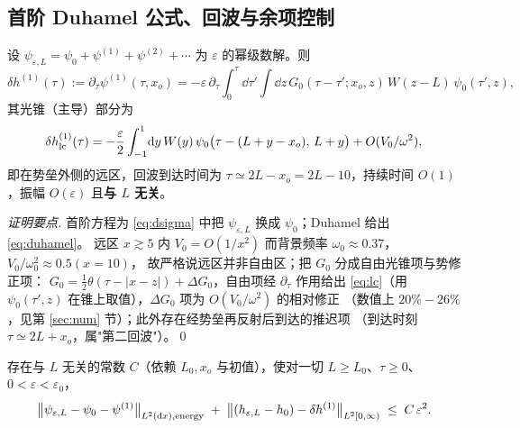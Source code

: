 \subsection{首阶 Duhamel 公式、回波与余项控制}

\begin{proposition}[首阶波形差]\label{prop:first}
设 $\psi_{\varepsilon,L}=\psi_0+\psi^{(1)}+\psi^{(2)}+\cdots$ 为 $\varepsilon$ 的幂级数解。则
\begin{equation}
\delta h^{(1)}(\tau):=\partial_\tau\psi^{(1)}(\tau,x_o)
=-\varepsilon\,\partial_\tau\!\int_0^\tau\!\dd\tau'\!\int\!\dd z\,
G_0(\tau-\tau';x_o,z)\,W(z-L)\,\psi_0(\tau',z),
\label{eq:duhamel}
\end{equation}
其光锥（主导）部分为
\begin{equation}
\delta h^{(1)}_{\rm lc}(\tau)=-\frac{\varepsilon}{2}\int_{-1}^{1}\!\mathrm{d} y\,
W(y)\,\psi_0\big(\tau-(L+y-x_o),\,L+y\big)+O(V_0/\omega^2),
\label{eq:lc}
\end{equation}
即在势垒外侧的远区，回波到达时间为 $\tau\simeq 2L-x_o=2L-10$，持续时间 $O(1)$，振幅
$O(\varepsilon)$ 且\textbf{与 $L$ 无关}。
\end{proposition}

\begin{proof}[证明要点]
首阶方程为 \eqref{eq:dsigma} 中把 $\psi_{\varepsilon,L}$ 换成 $\psi_0$；Duhamel 给出 \eqref{eq:duhamel}。
远区 $x\gtrsim5$ 内 $V_0=O(1/x^2)$ 而背景频率 $\omega_0\approx0.37$，$V_0/\omega_0^2\approx0.5(x=10)$，
故严格说远区并非自由区；把 $G_0$ 分成自由光锥项与势修正项：
$G_0=\frac12\theta(\tau-|x-z|)+\Delta G_0$，自由项经 $\partial_\tau$ 作用给出
\eqref{eq:lc}（用 $\psi_0(\tau',z)$ 在锥上取值），$\Delta G_0$ 项为 $O(V_0/\omega^2)$ 的相对修正
（数值上 $20\%\!-\!26\%$，见第 \ref{sec:num} 节）；此外存在经势垒再反射后到达的推迟项
（到达时刻 $\tau\simeq2L+x_o$，属"第二回波"）。\qed
\end{proof}

\begin{proposition}\label{prop:rem}
存在与 $L$ 无关的常数 $C$（依赖 $L_0,x_o$ 与初值），使对一切 $L\ge L_0$、$\tau\ge0$、$0<\varepsilon<\varepsilon_0$，
\begin{equation}
\big\|\psi_{\varepsilon,L}-\psi_0-\psi^{(1)}\big\|_{L^2(\mathrm{d} x),\mathrm{energy}}^{\vphantom{1}}
\;+\;\big\|(h_{\varepsilon,L}-h_0)-\delta h^{(1)}\big\|_{L^2[0,\infty)}
\;\le\; C\,\varepsilon^2 .
\label{eq:remainder}
\end{equation}
\end{proposition}

